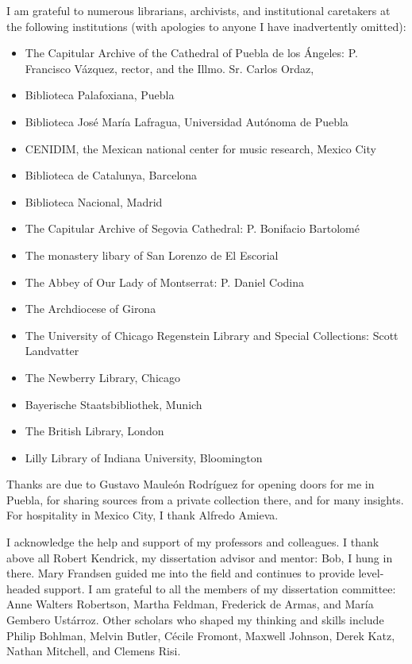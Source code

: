 I am grateful to numerous librarians, archivists, and institutional
caretakers at the following institutions (with apologies to anyone I have
inadvertently omitted):
\begin{itemize}
    \item The Capitular Archive of the Cathedral of Puebla de los Ángeles:
        P. Francisco Vázquez, rector, and the Illmo. Sr. Carlos
        Ordaz, 
    \item Biblioteca Palafoxiana, Puebla
    \item Biblioteca José María Lafragua, Universidad Autónoma de Puebla
    \item CENIDIM, the Mexican national center for music research, Mexico
        City
    \item Biblioteca de Catalunya, Barcelona
    \item Biblioteca Nacional, Madrid
    \item The Capitular Archive of Segovia Cathedral: P. Bonifacio Bartolomé
    \item The monastery libary of San Lorenzo de El Escorial
    \item The Abbey of Our Lady of Montserrat: P. Daniel Codina
    \item The Archdiocese of Girona
    \item The University of Chicago Regenstein Library and Special
        Collections: Scott Landvatter
    \item The Newberry Library, Chicago
    \item Bayerische Staatsbibliothek, Munich
    \item The British Library, London
    \item Lilly Library of Indiana University, Bloomington
\end{itemize}
Thanks are due to Gustavo Mauleón Rodríguez for opening doors for me in
Puebla, for sharing sources from a private collection there, and for many
insights.
For hospitality in Mexico City, I thank Alfredo Amieva.

I acknowledge the help and support of my professors and colleagues.
I thank above all Robert Kendrick, my dissertation advisor and mentor: 
Bob, I hung in there. 
Mary Frandsen guided me into the field and continues to provide level-headed
support.
I am grateful to all the members of my dissertation committee: Anne Walters
Robertson, Martha Feldman, Frederick de Armas, and María Gembero Ustárroz.
Other scholars who shaped my thinking and skills include 
Philip Bohlman,
Melvin Butler, 
Cécile Fromont, 
Maxwell Johnson, 
Derek Katz, 
Nathan Mitchell,
and 
Clemens Risi.

